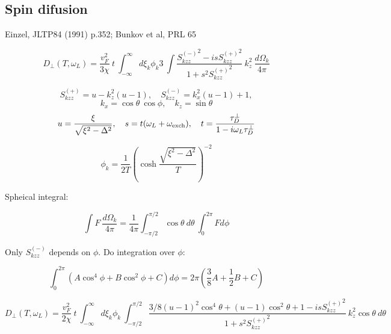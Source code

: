 \documentclass[a4paper]{article}
\begin{document}
\subsection*{Spin difusion}

\def\tdp{\tau_D^\perp}
\def\ol{\omega_L}
\def\oe{\omega_{\rm exch}}
\def\sm{S_{kzz}^{(-)}}
\def\sp{S_{kzz}^{(+)}}

Einzel, JLTP84 (1991) p.352; Bunkov et al, PRL 65

$$
D_\perp (T, \ol) =
  \frac{v_F^2}{3\chi}\ t
  \ \int_{-\infty}^{\infty}
  d\xi_k\phi_k 3
  \ \int \frac{{\sm}^2 - is{\sp}^2}{1+s^2{\sp}^2}
  \  k_z^2\ \frac{d\Omega_k}{4\pi}
$$

$$
\sp = u - k_z^2(u-1),\quad
\sm = k_x^2(u-1) + 1,
$$
$$
k_x = \cos\theta\ \cos\phi, \quad
k_z = \sin\theta
$$
$$
u=\frac{\xi}{\sqrt{\xi^2-\Delta^2}}, \quad
s = t(\ol+\oe),\quad
t = \frac{\tdp}{1-i\ol\tdp}
$$

$$
\phi_k = \frac{1}{2T}\left(\cosh\frac{\sqrt{\xi^2-\Delta^2}}{T}\right)^{-2}
$$

Spheical integral:

$$
\int F\ \frac{d\Omega_k}{4\pi} =
  \frac1{4\pi}\int_{-\pi/2}^{\pi/2} \cos\theta\ d\theta
  \ \int_0^{2\pi} F d\phi
$$

Only $\sm$ depends on $\phi$. Do integration over $\phi$:

$$
\int_0^{2\pi} (A\cos^4\phi + B\cos^2\phi + C) d\phi =
2\pi(\frac38 A + \frac12 B + C)
$$


$$
D_\perp (T, \ol) =
  \frac{v_F^2}{2\chi}\ t
  \ \int_{-\infty}^{\infty}
  d\xi_k\phi_k
  \ \int_{-\pi/2}^{\pi/2}
   \frac{3/8(u-1)^2\cos^4\theta + (u-1)\cos^2\theta + 1 - is{\sp}^2}{1+s^2{\sp}^2}
  \  k_z^2 \cos\theta \ d\theta
$$

$$
$$
\end{document}

